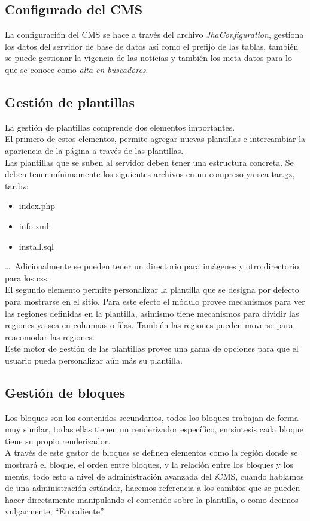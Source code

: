 \subsection{Configurado del CMS}
La configuraci\'on del CMS se hace a trav\'es del archivo \textit{JhaConfiguration}, gestiona los datos del servidor de base de datos as\'i como el prefijo de las tablas, tambi\'en se puede gestionar la vigencia de las noticias y tambi\'en los meta-datos para lo que se conoce como \textit{alta en buscadores}.

\subsection{Gesti\'on de plantillas}
La gesti\'on de plantillas comprende dos elementos importantes.\\
El primero de estos elementos, permite agregar nuevas plantillas e intercambiar la apariencia de la p\'agina a trav\'es de las plantillas.\\
Las plantillas que se suben al servidor deben tener una estructura concreta. Se deben tener m\'inimamente los siguientes archivos en un compreso ya sea tar.gz, tar.bz:
\begin{itemize}
\item index.php
\item info.xml
\item install.sql
\end{itemize}
\ldots\ Adicionalmente se pueden tener un directorio para im\'agenes y otro directorio para los css.\\
El segundo elemento permite personalizar la plantilla que se designa por defecto para mostrarse en el sitio. Para este efecto el m\'odulo provee mecanismos para ver las regiones definidas en la plantilla, asimismo tiene mecanismos para dividir las regiones ya sea en columnas o filas. Tambi\'en las regiones pueden moverse para reacomodar las regiones.\\
Este motor de gesti\'on de las plantillas provee una gama de opciones para que el usuario pueda personalizar a\'un m\'as su plantilla.

\subsection{Gesti\'on de bloques}
Los bloques son los contenidos secundarios, todos los bloques trabajan de forma muy similar, todas ellas tienen un renderizador espec\'ifico, en s\'intesis cada bloque tiene su propio renderizador.\\
A trav\'es de este gestor de bloques se definen elementos como la regi\'on donde se mostrar\'a el bloque, el orden entre bloques, y la relaci\'on entre los bloques y los men\'us, todo esto a nivel de administraci\'on avanzada del \textit{i}CMS, cuando hablamos de una administraci\'on est\'andar, hacemos referencia a los cambios que se pueden hacer directamente manipulando el contenido sobre la plantilla, o como decimos vulgarmente, ``En caliente''.

